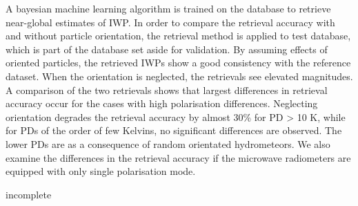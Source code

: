 \documentclass[amt, manuscript]{copernicus}
\newcommand{\todo}[1]{{\color{red} #1}}
\begin{document}
A bayesian machine learning algorithm is trained on the database to retrieve near-global estimates of IWP. In order to compare the retrieval accuracy with and without particle orientation, the retrieval method is applied to test database, which is part of the database set aside for validation. By assuming effects of oriented particles, the retrieved IWPs  show a good consistency with the reference dataset. When the orientation is neglected, the retrievals see elevated magnitudes. A comparison of the two retrievals shows that largest differences in retrieval accuracy occur for the cases with high polarisation differences. Neglecting orientation degrades the retrieval accuracy by almost 30\% for PD > 10\,\,K, while for PDs of the order of few Kelvins, no significant differences are observed. The lower PDs are as a consequence of random orientated hydrometeors. We also examine the differences in the retrieval accuracy if the microwave radiometers are equipped with only single polarisation mode. 



\todo{incomplete}
\end{document}
